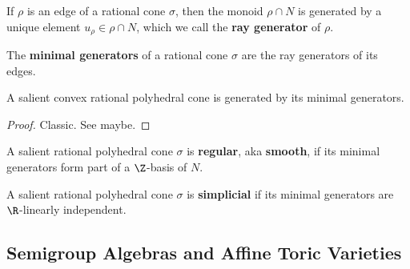 \begin{definition}
  \label{1-2-ray-gen}

  If $\rho$ is an edge of a rational cone $\sigma$, then the monoid $\rho \cap N$ is generated by a unique element $u_\rho \in \rho \cap N$, which we call the {\bf ray generator} of $\rho$.
\end{definition}


\begin{definition}
  \label{1-2-min-gen}

  The {\bf minimal generators} of a rational cone $\sigma$ are the ray generators of its edges.
\end{definition}


\begin{lemma}
  \label{1-2-15-cone-hull-min-gen}

  A salient convex rational polyhedral cone is generated by its minimal generators.
\end{lemma}
\begin{proof}
  \uses{}

  Classic. See \cite{Oda_1988} maybe.
\end{proof}


\begin{definition}
  \label{1-2-16-reg-cone}

  A salient rational polyhedral cone $\sigma$ is {\bf regular}, aka {\bf smooth}, if its minimal generators form part of a $\Z$-basis of $N$.
\end{definition}


\begin{definition}
  \label{1-2-16-simplicial-cone}

  A salient rational polyhedral cone $\sigma$ is {\bf simplicial} if its minimal generators are $\R$-linearly independent.
\end{definition}


\subsection{Semigroup Algebras and Affine Toric Varieties}


